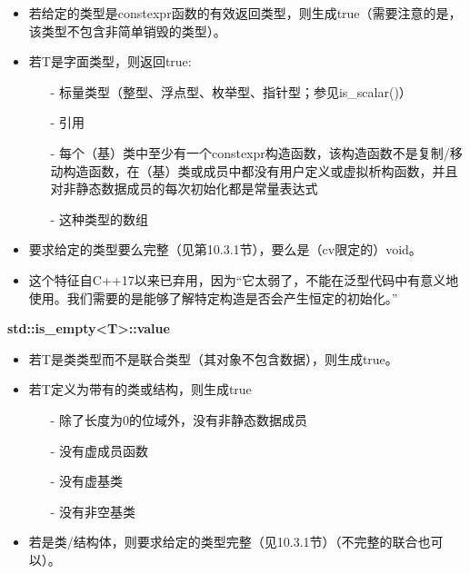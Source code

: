 \begin{itemize}
\item 
若给定的类型是constexpr函数的有效返回类型，则生成true（需要注意的是，该类型不包含非简单销毁的类型）。

\item 
若T是字面类型，则返回true:

\begin{itemize}
\item [-]
标量类型（整型、浮点型、枚举型、指针型；参见is\_scalar()）

\item [-]
引用

\item [-]
每个（基）类中至少有一个constexpr构造函数，该构造函数不是复制/移动构造函数，在（基）类或成员中都没有用户定义或虚拟析构函数，并且对非静态数据成员的每次初始化都是常量表达式

\item [-]
这种类型的数组
\end{itemize}

\item 
要求给定的类型要么完整（见第10.3.1节），要么是（cv限定的）void。

\item 
这个特征自C++17以来已弃用，因为“它太弱了，不能在泛型代码中有意义地使用。我们需要的是能够了解特定构造是否会产生恒定的初始化。”
\end{itemize}

\textbf{std::is\_empty<T>::value}

\begin{itemize}
\item 
若T是类类型而不是联合类型（其对象不包含数据），则生成true。

\item 
若T定义为带有的类或结构，则生成true

\begin{itemize}
\item [-]
除了长度为0的位域外，没有非静态数据成员

\item [-]
没有虚成员函数

\item [-]
没有虚基类

\item [-]
没有非空基类
\end{itemize}

\item 
若是类/结构体，则要求给定的类型完整（见10.3.1节）（不完整的联合也可以）。
\end{itemize}

